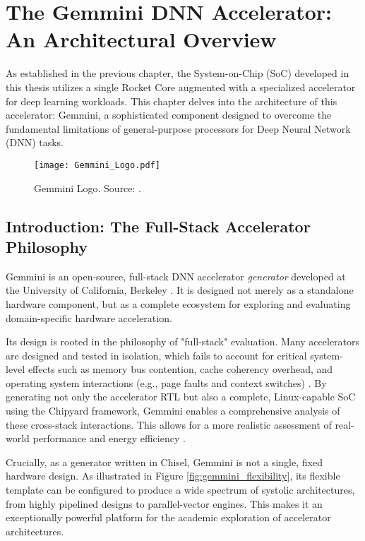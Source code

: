 \chapter{The Gemmini DNN Accelerator: An Architectural Overview}
\label{chap:gemmini_overview}

As established in the previous chapter, the System-on-Chip (SoC) developed in this thesis utilizes a single Rocket Core augmented with a specialized accelerator for deep learning workloads. This chapter delves into the architecture of this accelerator: Gemmini, a sophisticated component designed to overcome the fundamental limitations of general-purpose processors for Deep Neural Network (DNN) tasks.

\begin{figure}[htbp]
    \centering
    \texttt{[image: Gemmini\_Logo.pdf]}
    \caption{Gemmini Logo. Source: \cite{gemini-dac}.}
    \label{fig:gemmini_logo}
\end{figure}

\section{Introduction: The Full-Stack Accelerator Philosophy}
\label{sec:gemmini_intro}

Gemmini is an open-source, full-stack DNN accelerator \textit{generator} developed at the University of California, Berkeley \cite{gemini-dac}. It is designed not merely as a standalone hardware component, but as a complete ecosystem for exploring and evaluating domain-specific hardware acceleration. 

Its design is rooted in the philosophy of "full-stack" evaluation. Many accelerators are designed and tested in isolation, which fails to account for critical system-level effects such as memory bus contention, cache coherency overhead, and operating system interactions (e.g., page faults and context switches) \cite{gemini-dac}. By generating not only the accelerator RTL but also a complete, Linux-capable SoC using the Chipyard framework, Gemmini enables a comprehensive analysis of these cross-stack interactions. This allows for a more realistic assessment of real-world performance and energy efficiency \cite{gemini-dac}.

Crucially, as a generator written in Chisel, Gemmini is not a single, fixed hardware design. As illustrated in Figure \ref{fig:gemmini_flexibility}, its flexible template can be configured to produce a wide spectrum of systolic architectures, from highly pipelined designs to parallel-vector engines. This makes it an exceptionally powerful platform for the academic exploration of accelerator architectures.

